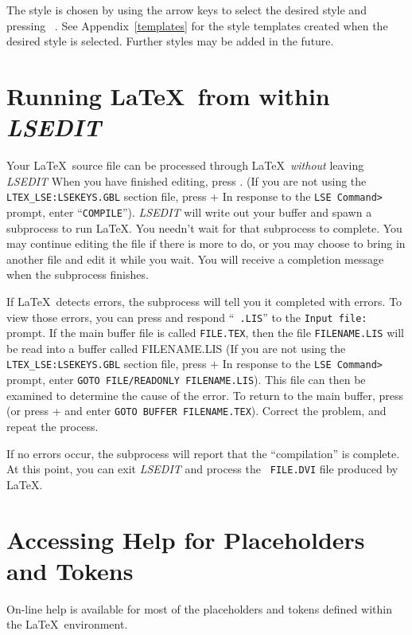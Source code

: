 The style is chosen by using the arrow keys to select the desired style and
pressing \mbox{ \return.} See Appendix~\ref{templates} for the style templates
created when the desired style is selected. Further styles may be added in the
future.

\section{Running \LaTeX\ from within {\sl LSEDIT\/}}

Your \LaTeX\ source file can be processed through \LaTeX\ {\em without\/}
leaving {\sl LSEDIT\/} When you have finished editing, press . (If
you are not using the {\tt LTEX\_LSE:LSEKEYS.GBL} section  file, press \gold +
 In response to the \verb"LSE Command>" prompt, enter ``{\tt COMPILE}'').
{\sl LSEDIT\/} will write out your buffer and spawn a subprocess to run \LaTeX.
You needn't wait for that subprocess to complete. You may continue editing the
file if there is more to do, or you may choose to bring in another file and
edit it while you wait. You will receive a completion message when the
subprocess finishes.


If \LaTeX\ detects errors, the subprocess will tell you it completed with
errors. To view those errors, you can press   and respond ``{\tt
.LIS}'' to the {\tt \us Input file:} prompt. If the main buffer file is called
{\tt FILE.TEX}, then the file {\tt FILENAME.LIS} will be read into a buffer
called FILENAME.LIS (If you are not using the {\tt LTEX\_LSE:LSEKEYS.GBL}
section file, press \gold +  In response to the  \verb"LSE Command>"
prompt, enter {\tt GOTO FILE/READONLY FILENAME.LIS}).   This file can then be
examined to determine the cause of the error. To return to the main buffer,
press   (or press \gold +  and enter {\tt GOTO BUFFER
FILENAME.TEX}). Correct the problem, and repeat the process.

If no errors occur, the subprocess will report that the ``compilation'' is
complete. At this point, you can exit {\sl LSEDIT\/} and process the {\tt
FILE.DVI} file produced by \LaTeX.

\section{Accessing Help for Placeholders and Tokens}

On-line help is available for most of the placeholders and tokens defined
within the \LaTeX\ environment.

